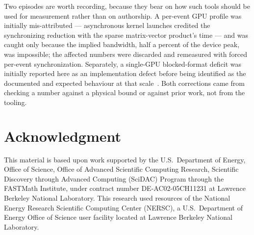 \documentclass[11pt]{article}
\begin{document}
Two episodes are worth recording, because they bear on how such tools should be
used for measurement rather than on authorship. A per-event GPU profile was
initially mis-attributed --- asynchronous kernel launches credited the
synchronizing reduction with the sparse matrix-vector product's time --- and was
caught only because the implied bandwidth, half a percent of the device peak, was
impossible; the affected numbers were discarded and remeasured with forced
per-event synchronization. Separately, a single-GPU blocked-format deficit was
initially reported here as an implementation defect before being identified as
the documented and expected behaviour at that scale~\cite{baijkokkos}. Both
corrections came from checking a number against a physical bound or against prior
work, not from the tooling.

\section*{Acknowledgment}

This material is based upon work supported by the U.S.\ Department of Energy,
Office of Science, Office of Advanced Scientific Computing Research, Scientific
Discovery through Advanced Computing (SciDAC) Program through the FASTMath
Institute, under contract number DE-AC02-05CH11231 at Lawrence Berkeley National
Laboratory. This research used resources of the National Energy Research
Scientific Computing Center (NERSC), a U.S.\ Department of Energy Office of
Science user facility located at Lawrence Berkeley National Laboratory.



\end{document}

